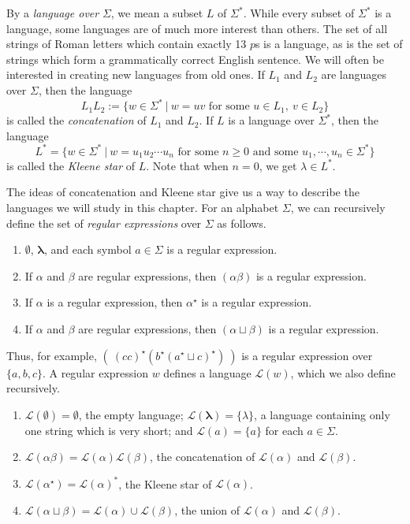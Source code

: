 \documentclass{article}
\newcommand{\El}{\mathcal L}
\newcommand{\emptysetb}{\mathbf \emptyset}
\newcommand{\lambdab}{\mathbf \lambda}
\begin{document}
By a \emph{language over} $\Sigma$, we mean a subset $L$ of $\Sigma^*$. While every subset of $\Sigma^*$ is a language, some languages are of much more interest than others. The set of all strings of Roman letters which contain exactly 13 $p$s is a language, as is the set of strings which form a grammatically correct English sentence. We will often be interested in creating new languages from old ones. If $L_1$ and $L_2$ are languages over $\Sigma$, then the language
\begin{equation*}
L_1 L_2 := \{ w \in \Sigma^*\ |\ w=uv \text{ for some } u \in L_1,\ v \in L_2 \}
\end{equation*}
is called the \emph{concatenation} of $L_1$ and $L_2$. If $L$ is a language over $\Sigma^*$, then the language
\begin{equation*}
L^* = \{ w \in \Sigma^*\ |\ w = u_1 u_2 \cdots u_n \text{ for some } n \geq 0 \text{ and some } u_1,\cdots,u_n \in \Sigma^* \}
\end{equation*}
is called the \emph{Kleene star} of $L$. Note that when $n = 0$, we get $\lambda \in L^*$.

The ideas of concatenation and Kleene star give us a way to describe the languages we will study in this chapter. For an alphabet $\Sigma$, we can recursively define the set of \emph{regular expressions} over $\Sigma$ as follows.
\begin{enumerate}
  \item $\emptysetb$, $\lambdab$, and each symbol $a \in \Sigma$ is a regular expression.
  \item If $\alpha$ and $\beta$ are regular expressions, then $(\alpha \beta)$ is a regular expression.
  \item If $\alpha$ is a regular expression, then $\alpha^\star$ is a regular expression.
  \item If $\alpha$ and $\beta$ are regular expressions, then $(\alpha \sqcup \beta)$ is a regular expression.
\end{enumerate}

Thus, for example, $(\ (cc)^\star (b^\star (a^\star \sqcup c)^\star)\ )$ is a regular expression over $\{ a,b,c \}$. A regular expression $w$ defines a language $\El(w)$, which we also define recursively.
\begin{enumerate}
  \item $\El(\emptysetb) = \emptyset$, the empty language; $\El(\lambdab) = \{ \lambda \}$, a language containing only one string which is very short; and $\El(a) = \{ a \}$ for each $a \in \Sigma$.
  \item $\El(\alpha \beta) = \El(\alpha) \El(\beta)$, the concatenation of $\El(\alpha)$ and $\El(\beta)$.
  \item $\El(\alpha^\star) = \El(\alpha)^*$, the Kleene star of $\El(\alpha)$.
  \item $\El(\alpha \sqcup \beta) = \El(\alpha) \cup \El(\beta)$, the union of $\El(\alpha)$ and $\El(\beta)$.
\end{enumerate}
\end{document}
